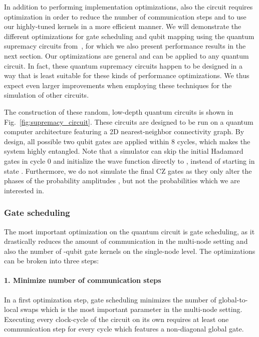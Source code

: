 \documentclass[sigconf]{acmart}
\begin{document}
In addition to performing implementation optimizations, also the circuit requires optimization in order to reduce the number of communication steps and to use our highly-tuned kernels in a more efficient manner. We will demonstrate the different optimizations for gate scheduling and qubit mapping using the quantum supremacy circuits from~\cite{boixo2016characterizing}, for which we also present performance results in the next section. Our optimizations are general and can be applied to any quantum circuit. In fact, these quantum supremacy circuits happen to be designed in a way that is least suitable for these kinds of performance optimizations. We thus expect even larger improvements when employing these techniques for the simulation of other circuits.

The construction of these random, low-depth quantum circuits is shown in Fig.~\ref{fig:supremacy_circuit}. These circuits are designed to be run on a quantum computer architecture featuring a 2D nearest-neighbor connectivity graph. By design, all possible two qubit gates are applied within 8 cycles, which makes the system highly entangled. Note that a simulator can skip the initial Hadamard gates in cycle 0 and initialize the wave function directly to , instead of starting in state . Furthermore, we do not simulate the final CZ gates as they only alter the phases of the probability amplitudes , but not the probabilities  which we are interested in.

\subsubsection{Gate scheduling}
The most important optimization on the quantum circuit is gate scheduling, as it drastically reduces the amount of communication in the multi-node setting and also the number of -qubit gate kernels on the single-node level. The optimizations can be broken into three steps:

\paragraph{1. Minimize number of communication steps}
In a first optimization step, gate scheduling minimizes the number of global-to-local swaps which is the most important parameter in the multi-node setting. Executing every clock-cycle of the circuit on its own requires at least one communication step for every cycle which features a non-diagonal global gate. 
 
\end{document}
